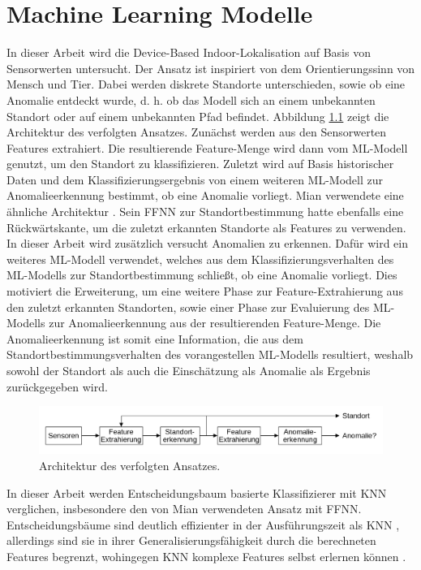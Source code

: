 \chapter{Machine Learning Modelle}
In dieser Arbeit wird die Device-Based Indoor-Lokalisation auf Basis von Sensorwerten untersucht.
Der Ansatz ist inspiriert von dem Orientierungssinn von Mensch und Tier.
Dabei werden diskrete Standorte unterschieden, sowie ob eine Anomalie entdeckt wurde,
d. h. ob das Modell sich an einem unbekannten Standort oder auf einem unbekannten Pfad befindet.
\newline
\newline
Abbildung \ref{fig:model_idea} zeigt die Architektur des verfolgten Ansatzes.
Zunächst werden aus den Sensorwerten Features extrahiert.
Die resultierende Feature-Menge wird dann vom ML-Modell genutzt, um den Standort zu klassifizieren.
Zuletzt wird auf Basis historischer Daten und dem Klassifizierungsergebnis von einem weiteren ML-Modell zur Anomalieerkennung bestimmt, ob eine Anomalie vorliegt.
\newline
\newline
Mian verwendete eine ähnliche Architektur \cite{naveedThesis}.
Sein FFNN zur Standortbestimmung hatte ebenfalls eine Rückwärtskante, um die zuletzt erkannten Standorte als Features zu verwenden.
In dieser Arbeit wird zusätzlich versucht Anomalien zu erkennen.
Dafür wird ein weiteres ML-Modell verwendet, welches aus dem Klassifizierungsverhalten des ML-Modells zur Standortbestimmung schließt, ob eine Anomalie vorliegt.
Dies motiviert die Erweiterung, um eine weitere Phase zur Feature-Extrahierung aus den zuletzt erkannten Standorten,
sowie einer Phase zur Evaluierung des ML-Modells zur Anomalieerkennung aus der resultierenden Feature-Menge.
Die Anomalieerkennung ist somit eine Information, die aus dem Standortbestimmungsverhalten des vorangestellen ML-Modells resultiert,
weshalb sowohl der Standort als auch die Einschätzung als Anomalie als Ergebnis zurückgegeben wird.
\begin{figure}[h!]
    \centering
    \includegraphics[width=\linewidth]{images/model_idea.png}
    \caption{Architektur des verfolgten Ansatzes.}
    \label{fig:model_idea}
\end{figure}
\newline
In dieser Arbeit werden Entscheidungsbaum basierte Klassifizierer mit KNN verglichen, insbesondere den von Mian verwendeten Ansatz mit FFNN.
Entscheidungsbäume sind deutlich effizienter in der Ausführungszeit als KNN \cite{dymelThesis},
allerdings sind sie in ihrer Generalisierungsfähigkeit durch die berechneten Features begrenzt,
wohingegen KNN komplexe Features selbst erlernen können \cite{seide2011feature}.







